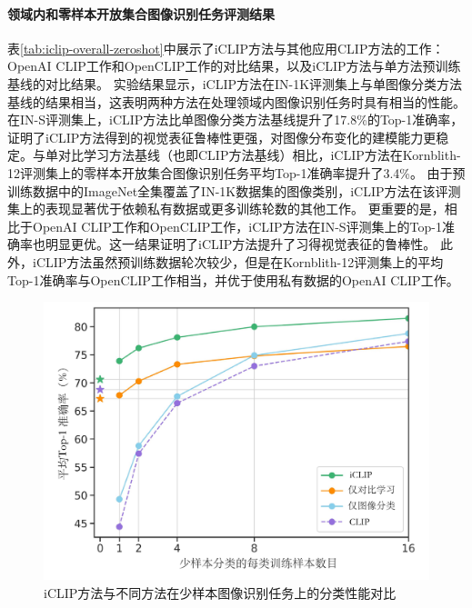\paragraph{领域内和零样本开放集合图像识别任务评测结果} 表\ref{tab:iclip-overall-zeroshot}中展示了iCLIP方法与其他应用CLIP方法的工作：OpenAI CLIP\cite{radford2021learning}工作和OpenCLIP\cite{openclip}工作的对比结果，以及iCLIP方法与单方法预训练基线的对比结果。
实验结果显示，iCLIP方法在IN-1K评测集上与单图像分类方法基线的结果相当，这表明两种方法在处理领域内图像识别任务时具有相当的性能。在IN-S评测集上，iCLIP方法比单图像分类方法基线提升了17.8\%的Top-1准确率，证明了iCLIP方法得到的视觉表征鲁棒性更强，对图像分布变化的建模能力更稳定。与单对比学习方法基线（也即CLIP方法基线）相比，iCLIP方法在Kornblith-12评测集上的零样本开放集合图像识别任务平均Top-1准确率提升了3.4\%。
由于预训练数据中的ImageNet全集覆盖了IN-1K数据集的图像类别，iCLIP方法在该评测集上的表现显著优于依赖私有数据或更多训练轮数的其他工作。
更重要的是，相比于OpenAI CLIP工作和OpenCLIP工作，iCLIP方法在IN-S评测集上的Top-1准确率也明显更优。这一结果证明了iCLIP方法提升了习得视觉表征的鲁棒性。
此外，iCLIP方法虽然预训练数据轮次较少，但是在Kornblith-12评测集上的平均Top-1准确率与OpenCLIP工作相当，并优于使用私有数据的OpenAI CLIP工作。 %


\begin{figure}
  \centering
  \includegraphics[width=0.8\linewidth]{figures/iclip-fewshot.pdf}
  \caption{iCLIP方法与不同方法在少样本图像识别任务上的分类性能对比}
  \label{fig:iclip-fewshot}
\end{figure}

